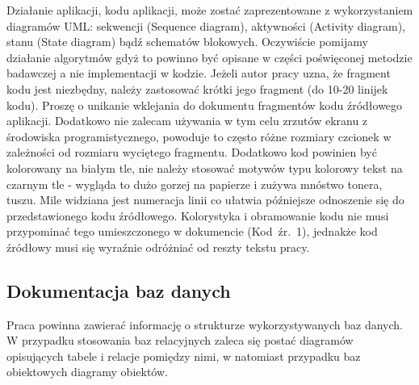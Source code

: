 \documentclass[12pt,a4paper]{article}
\begin{document}
Działanie aplikacji, kodu aplikacji, może zostać zaprezentowane z wykorzystaniem diagramów UML\cite{UML}: sekwencji (Sequence diagram), aktywności (Activity diagram), stanu (State diagram) bądź schematów blokowych. Oczywiście pomijamy działanie algorytmów gdyż to powinno być opisane w części poświęconej metodzie badawczej a nie implementacji w kodzie. Jeżeli autor pracy uzna, że fragment kodu jest niezbędny, należy zastosować krótki jego fragment (do 10-20 linijek kodu). Proszę o unikanie wklejania do dokumentu fragmentów kodu źródłowego aplikacji. Dodatkowo nie zalecam używania w tym celu zrzutów ekranu z środowiska programistycznego, powoduje to często różne rozmiary czcionek w zależności od rozmiaru wyciętego fragmentu. Dodatkowo kod powinien być kolorowany na białym tle, nie należy stosować motywów typu kolorowy tekst na czarnym tle - wygląda to dużo gorzej na papierze i zużywa mnóstwo tonera, tuszu. Mile widziana jest numeracja linii co ułatwia późniejsze odnoszenie się do przedstawionego kodu źródłowego. Kolorystyka i obramowanie kodu nie musi przypominać tego umieszczonego w dokumencie (Kod~źr.~1), jednakże kod źródłowy musi się wyraźnie odróżniać od reszty tekstu pracy.




\subsection{Dokumentacja baz danych}
Praca powinna zawierać informację o strukturze wykorzystywanych baz danych. W przypadku stosowania baz relacyjnych zaleca się postać diagramów opisujących tabele i relacje pomiędzy nimi, w natomiast przypadku baz obiektowych diagramy obiektów.

\end{document}
